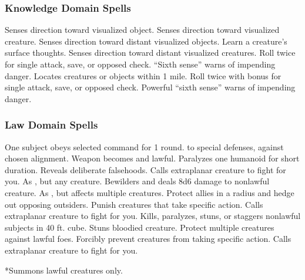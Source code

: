 \subsubsection{Knowledge Domain Spells}

\begin{spelllist}
     Senses direction toward visualized object.
    \spellhead[1]{}
     Senses direction toward visualized creature.
    \spellhead[2]{}
     Senses direction toward distant visualized objects.
     Learn a creature's surface thoughts.
     Senses direction toward distant visualized creatures.
     Roll twice for single attack, save, or opposed check.
     ``Sixth sense'' warns of impending danger.
    \spellhead[5]{}
     Locates creatures or objects within 1 mile.
    \spellhead[7]{}
     Roll twice with bonus for single attack, save, or opposed check.
    \spellhead[8]{}
    \spellhead[8]{}
     Powerful ``sixth sense'' warns of impending danger.
\end{spelllist}

\subsubsection{Law Domain Spells}

\begin{spelllist}
     One subject obeys selected command for 1 round.
      to special defenses,  against chosen alignment.
     Weapon becomes  and lawful.
     Paralyzes one humanoid for short duration.
     Reveals deliberate falsehoods.
     Calls extraplanar creature to fight for you.
     As , but any creature.
     Bewilders and deals 8d6 damage to nonlawful creature.
     As , but affects multiple creatures.
     Protect allies in a \areamed radius and hedge out opposing outsiders.
     Punish creatures that take specific action.
     Calls extraplanar creature to fight for you.
     Kills, paralyzes, stuns, or staggers nonlawful subjects in 40 ft. cube.
    \spellhead[7]{}
     Stuns bloodied creature.
    \F Protect multiple creatures against lawful foes.
     Forcibly prevent creatures from taking specific action.
     Calls extraplanar creature to fight for you.
\end{spelllist}
*Summons lawful creatures only.

